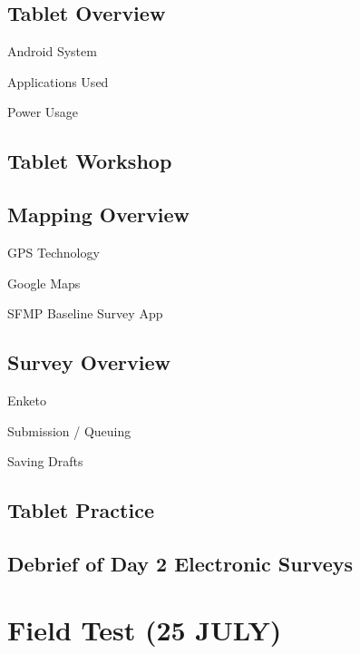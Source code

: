 \documentclass[a4paper,agenda,11pt]{meetingmins}
\begin{document}
\subsection{Tablet Overview}
\begin{subitems}
\item Android System
\item Applications Used
\item Power Usage
\end{subitems}

\subsection{Tablet Workshop}

\subsection{Mapping Overview}
\begin{subitems}
\item GPS Technology
\item Google Maps
\item SFMP Baseline Survey App
\end{subitems}

\subsection{Survey Overview}
\begin{subitems}
\item Enketo
\item Submission / Queuing
\item Saving Drafts
\end{subitems}


\subsection{Tablet Practice}

\subsection{Debrief of Day 2 Electronic Surveys}


\pagebreak

\section{Field Test (25 JULY)}
\end{document}
